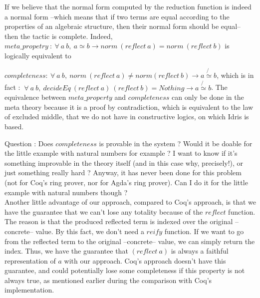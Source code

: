 If we believe that the normal form computed by the reduction function is indeed a normal form --which means that if two terms are equal according to the properties of an algebraic structure, then their normal form should be equal-- then the tactic is complete.
Indeed, 
$meta\_propetry\ :\ \forall\ a\ b,\ a \simeq b \rightarrow norm\ (reflect\ a) = norm\ (reflect\ b)$ is logically equivalent to

$completeness : \ \forall\ a\ b,\ norm\ (reflect\ a) \neq norm(reflect\ b) \rightarrow a \not{\simeq} b$, which is in fact :
$\ \forall\ a\ b,\ decideEq\ (reflect\ a)\ (reflect\ b) = Nothing \rightarrow a \not{\simeq} b$.
The equivalence between $meta\_property$ and $completeness$ can only be done in the meta theory because it is a proof by contradiction, which is equivalent to the law of excluded middle, that we do not have in constructive logics, on which Idris is based.

Question : Does $completeness$ is provable in the system ? Would it be doable for the little example with natural numbers for example ? I want to know if it's something improvable in the theory itself (and in this case why, precisely!), or just something really hard ?
Anyway, it has never been done for this problem (not for Coq's ring prover, nor for Agda's ring prover). Can I do it for the little example with natural numbers though ? \\

Another little advantage of our approach, compared to Coq's approach, is that we have the guarantee that we can't lose any totality because of the $reflect$ function. The reason is that the produced reflected term is indexed over the original --concrete-- value. By this fact, we don't need a $reify$ function. If we want to go from the reflected term to the original --concrete-- value, we can simply return the index. Thus, we have the guarantee that $(reflect\ a)$ is always a faithful representation of $a$ with our approach. Coq's approach doesn't have this guarantee, and could potentially lose some completeness if this property is not always true, as mentioned earlier during the comparison with Coq's implementation.